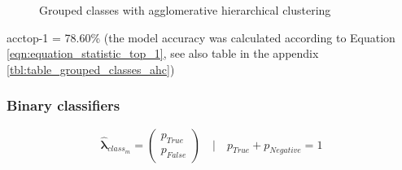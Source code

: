\documentclass[10pt]{article}
\newcommand\inputpgf[2]{{
\let\pgfimageWithoutPath\pgfimage
\renewcommand{\pgfimage}[2][]{\pgfimageWithoutPath[##1]{#1/##2}}

}}
\newif\ifen
\newif\ifde
\newcommand{\en}[1]{\ifen#1\fi}
\newcommand{\de}[1]{\ifde#1\fi}
\begin{document}
						\begin{figure}[H]
							\begin{center}
								\scalebox{0.5}{
									\inputpgf{images/pgf}{pca-grouped-ahc.pgf}
								}
							\end{center}
							\caption{Grouped classes with agglomerative hierarchical clustering}
							\label{fig:analysis_grouped_classes_with_ahc}
						\end{figure}
						
						acctop-1 = 78.60\% (the model accuracy was calculated according to Equation \eqref{eqn:equation_statistic_top_1}, see also table in the appendix \ref{tbl:table_grouped_classes_ahc})
						
						\de{}
						\en{}
			
			\subsubsection{Binary classifiers}
				\de{Ein binärer Klassifizierer kennt nur zwei Zustände. Entweder trifft eine Eigenschaft zu oder sie trifft nicht zu. Lässt man zum Beispiel mit einem Klassifikator der Klasse \texttt{salad} ein Element klassifizieren, so gibt dieser Klassifikator zurück, mit welcher Wahrscheinlichkeit dieses Bild Salat ist oder nicht:}
				\en{A binary classifier knows only two states.  Either a property is true or it is not true. For example, if one uses a classifier of the class \texttt{salad} to classify an element, this classifier returns the probability returns the probability that this image is salad or not (Equation \eqref{eq:equation_binary_probability_vector}).}

					\begin{equation}
						\label{eq:equation_binary_probability_vector}
						\hat{\boldsymbol\lambda}_{class_{m}} = 
						\left(
							\begin{array}{c}
							p_{True}\\
							p_{False}
							\end{array}
						\right)
						\quad\Biggl\lvert \quad p_{True} + p_{Negative} = 1
					\end{equation}
\end{document}
